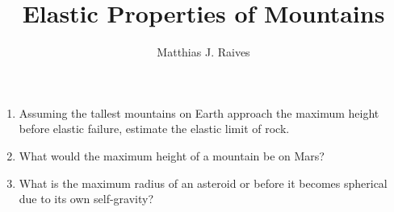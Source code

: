 \documentclass{article}
\title{Elastic Properties of Mountains}
\author{Matthias J. Raives}
\begin{document}
  
  \maketitle{}
  
  \begin{enumerate}
    \item Assuming the tallest mountains on Earth approach the maximum height before elastic failure, estimate the elastic limit of rock.
    \item What would the maximum height of a mountain be on Mars?
    \item What is the maximum radius of an asteroid or before it becomes spherical due to its own self-gravity?
  \end{enumerate}
  
\end{document}
